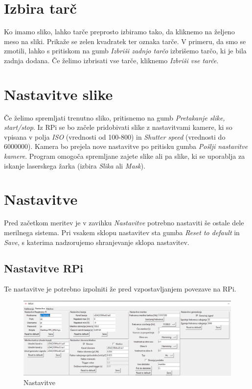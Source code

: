 \section{Izbira tarč}
Ko imamo sliko, lahko tarče preprosto izbiramo tako, da kliknemo na željeno meso na sliki. Prikaže se zelen kvadratek ter oznaka tarče. V primeru, da smo se zmotili, lahko s pritiskom na gumb \textit{Izbriši zadnjo tarčo} izbrišemo tarčo, ki je bila zadnja dodana. Če želimo izbrisati vse tarče, kliknemo \textit{Izbriši vse tarče}.

\section{Nastavitve slike}
Če želimo spremljati trenutno sliko, pritisnemo na gumb \textit{Pretakanje slike, start/stop}. Iz RPi se bo začele pridobivati slike z nastavitvami kamere, ki so vpisana v polja \textit{ISO} (vrednosti od 100-800) in \textit{Shutter speed} (vrednosti do 6000000). Kamera bo prejela nove nastavitve po pritisku gumba \textit{Pošlji nastavitve kamere}. Program omogoča spremljane zajete slike ali pa slike, ki se uporablja za iskanje laserskega žarka (izbira \textit{Slika} ali \textit{Mask}).

\section{Nastavitve}

Pred začetkom meritev je v zavihku \textit{Nastavitve} potrebno nastaviti še ostale dele merilnega sistema. Pri vsakem sklopu nastavitev sta gumba \textit{Reset to default} in \textit{Save}, s katerima nadzorujemo shranjevanje sklopa nastavitev.
\subsection{Nastavitve RPi}
Te nastavitve je potrebno izpolniti že pred vzpostavljanjem povezave na RPi.


\begin{figure}[H]
    \centering
    \includegraphics[width=.9\linewidth,trim=0 0 0 25,clip]{slike/zavihek_nastavitve.png}
    \caption{Nastavitve}
    \label{fig:nastavitve}
\end{figure}

